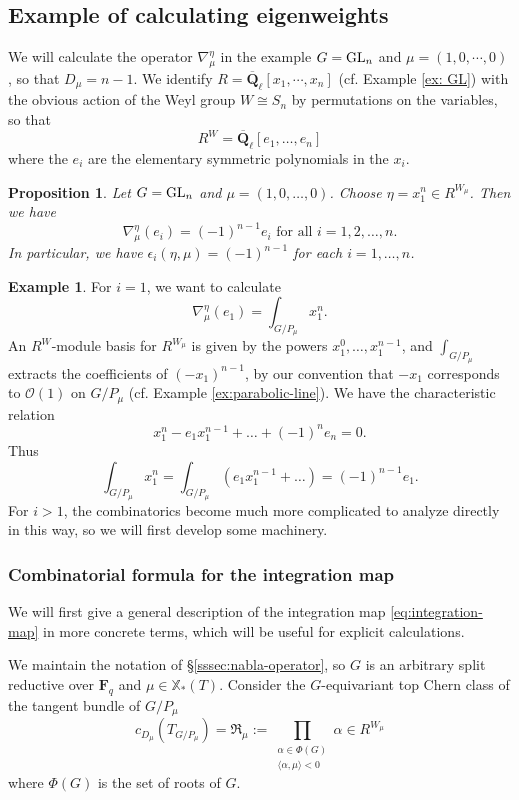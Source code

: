 \documentclass[reqno]{amsart}
\numberwithin{equation}{subsection}
\newtheorem{prop}[subsubsection]{Proposition}
\theoremstyle{definition}
\newtheorem{exam}[subsubsection]{Example}
\newcommand\cO{\mathcal{O}}
\newcommand\frR{\mathfrak{R}}
\newcommand\GL{\textup{GL}}
\newcommand\xcoch{\mathbb{X}_*}
\newcommand{\Qlbar}{\overline{\Q}_\ell}
\renewcommand{\j}[1]{\langle{#1}\rangle}
\renewcommand\a\alpha
\newcommand{\y}{\eta}
\newcommand\nb{\nabla}
\newcommand{\F}{\mathbf{F}}
\newcommand{\Q}{\mathbf{Q}}
\begin{document}
\subsection{Example of calculating eigenweights}\label{ssec:GLn-lambda-minimal} We will calculate the operator $\nb^{\y}_{\mu}$ in the example $G=\GL_{n}$ and $\mu=(1,0,\cdots,0)$, so that $D_{\mu} = n-1$. We identify $R=\Qlbar[x_{1},\cdots, x_{n}]$ (cf. Example \ref{ex: GL}) with the obvious action of the Weyl group $W\cong S_n$ by permutations on the variables, so that 
\[
R^W  = \Qlbar[e_1, \ldots, e_n]
\]
where the $e_i$ are the elementary symmetric polynomials in the $x_i$. 


\begin{prop}\label{prop:GLn-minimal-eps}
Let $G = \GL_n$ and $\mu = (1, 0, \ldots, 0)$. Choose $\eta = x_1^n \in R^{W_\mu}$. Then we have
\begin{equation*}
\nb_{\mu}^\eta(e_{i})= (-1)^{n-1} e_{i} \text{ for all } i=1, 2, \ldots, n.
\end{equation*}
In particular, we have
 $\epsilon_i(\eta, \mu) = (-1)^{n-1}$ for each $i = 1, \ldots, n$. 
\end{prop}

\begin{exam}
For $i=1$, we want to calculate 
\[
\nb_{\mu}^\eta(e_{1}) = \int_{G/P_\mu} x_1^n.
\]
An $R^W$-module basis for $R^{W_\mu}$ is given by the powers $x_1^0, \ldots, x_1^{n-1}$, and $\int_{G/P_\mu}$ extracts the coefficients of $(-x_1)^{n-1}$, by our convention that $-x_1$ corresponds to $\cO(1)$ on $G/P_\mu$ (cf. Example \ref{ex:parabolic-line}). We have the characteristic relation
\[
x_1^n - e_1 x_1^{n-1} + \ldots + (-1)^n e_n = 0.
\]
Thus 
\[
\int_{G/P_\mu} x_1^n = \int_{G/P_\mu} (e_1 x_1^{n-1} + \ldots )  = (-1)^{n-1} e_1 .
\]
For $i>1$, the combinatorics become much more complicated to analyze directly in this way, so we will first develop some machinery. 
\end{exam}
 

\subsubsection{Combinatorial formula for the integration map}
We will first give a general description of the integration map \eqref{eq:integration-map} in more concrete terms, which will be useful for explicit calculations. 

We maintain the notation of \S \ref{sssec:nabla-operator}, so $G$ is an arbitrary split reductive over $\F_q$ and $\mu \in \xcoch(T)$. Consider the $G$-equivariant top Chern class of the tangent bundle of $G/P_{\mu}$
\begin{equation}\label{eq:equivariant-top-Chern}
c_{D_\mu}(T_{G/P_{\mu}})=\frR_{\mu} :=\prod_{\substack{\alpha \in \Phi(G)  \\ \j{\a,\mu} < 0}}\a\in R^{W_{\mu}}
\end{equation}
where $\Phi(G)$ is the set of roots of $G$.  
\end{document}
